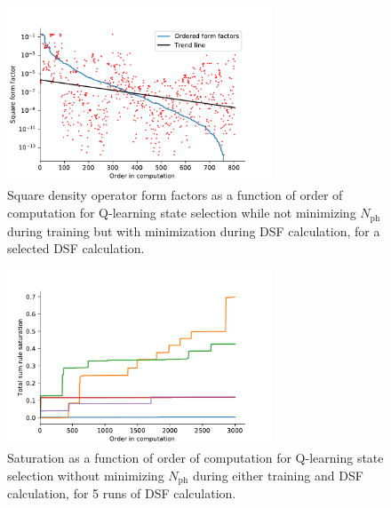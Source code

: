 \documentclass[11pt, a4paper]{report} %
\begin{document}
\begin{figure}[tb!]
  \centering
  \includegraphics[width=0.7\textwidth]{ff_sizes_rand_False_check_train_False_check_eval_True.pdf}
  \caption{Square density operator form factors as a function of order of computation for Q-learning state selection while not minimizing \(N_{\mathrm{ph}}\) during training but with minimization during DSF calculation, for a selected DSF calculation.}\label{fig:ff_sizes_rand_False_check_train_False_check_eval_True}
\end{figure}



\begin{figure}[tb!]
  \centering
  \includegraphics[width=0.7\textwidth]{saturation_histories_rand_False_check_train_False_check_eval_False.pdf}
  \caption{Saturation as a function of order of computation for Q-learning state selection without minimizing \(N_{\mathrm{ph}}\) during either training and DSF calculation, for 5 runs of DSF calculation.}\label{fig:saturation_histories_rand_False_check_train_False_check_eval_False}
\end{figure}
\end{document}
